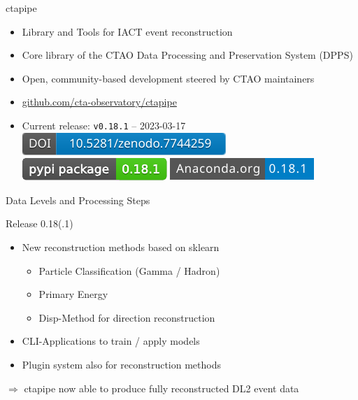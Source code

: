 \documentclass[aspectratio=1610, 9pt]{beamer}
\begin{document}
\begin{frame}{ctapipe}
  \begin{itemize}
    \item Library and Tools for IACT event reconstruction
    \item Core library of the CTAO Data Processing and Preservation System (DPPS)
    \item Open, community-based development steered by CTAO maintainers
    \item \href{https://github.com/cta-observatory/ctapipe}{github.com/cta-observatory/ctapipe}
    \item Current release: \texttt{v0.18.1} – 2023-03-17
      \href{https://doi.org/10.5281/zenodo.3372210}{\includegraphics[height=2ex]{images/ctapipe_zenodo.pdf}}
      \href{https://pypi.org/project/ctapipe}{\includegraphics[height=2ex]{images/ctapipe_pypi.pdf}}
      \href{https://anaconda.org/conda-forge/ctapipe}{\includegraphics[height=2ex]{images/ctapipe_conda.pdf}}
  \end{itemize}
\end{frame}

\begin{frame}
  
\end{frame}

\begin{frame}{Data Levels and Processing Steps}
  \vspace{-0.5cm}%
  
\end{frame}

\begin{frame}{Release 0.18(.1)}
  \begin{itemize}
    \item New reconstruction methods based on sklearn
      \begin{itemize}
        \item Particle Classification (Gamma / Hadron)
        \item Primary Energy
        \item Disp-Method for direction reconstruction
      \end{itemize}
    \item CLI-Applications to train / apply models
    \item Plugin system also for reconstruction methods
  \end{itemize}

  \bigskip
  \begin{center}
    \large
    $\Rightarrow$ ctapipe now able to produce fully reconstructed DL2 event data
  \end{center}
\end{frame}
\end{document}
